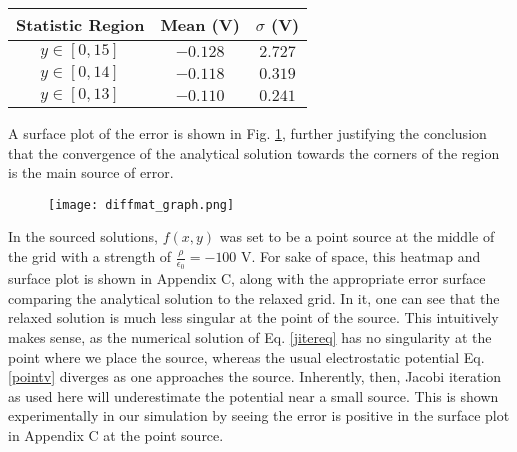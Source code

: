 \documentclass[reprint, amsmath, amssymb, aps, floatfix]{revtex4-1}
\begin{document}
\begin{table}
	\vspace{2ex}
\begin{tabular}{|c|c|c|}
	\hline
	Statistic Region & Mean (V) & $\sigma$ (V)  \\ \hline
	$y\in[0,15]$ & $-0.128$ & $2.727$ \\ \hline
	$y\in[0, 14]$ & $-0.118$ & $0.319$ \\ \hline
	$y\in[0, 13]$ & $-0.110$ & $0.241$  \\ \hline
\end{tabular}
\vspace{1ex}
\label{tab:stats}
\end{table}

A surface plot of the error is shown in Fig. \ref{diffmat}, further justifying the conclusion that the convergence of the analytical solution towards the corners of the region is the main source of error.

\begin{figure}
	\texttt{[image: diffmat\_graph.png]}
	\label{diffmat}
\end{figure}


In the sourced solutions, $f(x,y)$ was set to be a point source at the middle of the grid with a strength of $ \frac{\rho}{\epsilon_0}=-100$ V. For sake of space, this heatmap and surface plot is shown in Appendix C, along with the appropriate error surface comparing the analytical solution to the relaxed grid. In it, one can see that the relaxed solution is much less singular at the point of the source. This intuitively makes sense, as the numerical solution of Eq. \eqref{jitereq} has no singularity at the point where we place the source, whereas the usual electrostatic potential Eq. \eqref{pointv} diverges as one approaches the source. Inherently, then, Jacobi iteration as used here will underestimate the potential near a small source. This is shown experimentally in our simulation by seeing the error is positive in the surface plot in Appendix C at the point source.
\end{document}
